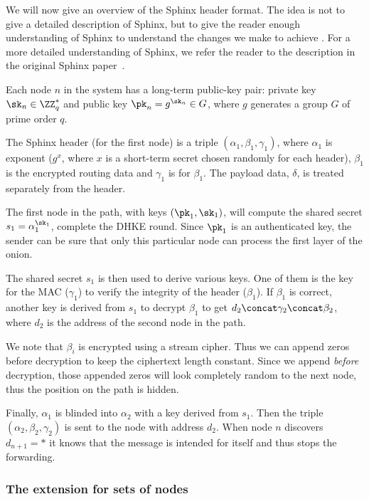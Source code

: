 We will now give an overview of the \ac{Sphinx} header format.
The idea is not to give a detailed description of \ac{Sphinx}, but to give the 
reader enough understanding of \ac{Sphinx} to understand the changes we make to 
achieve \Sphinxes.
For a more detailed understanding of Sphinx, we refer the reader to the 
description in the original Sphinx paper~\cite{Sphinx}.

Each node \(n\) in the system has a long-term public-key pair: private key 
\(\sk_n\in \ZZ_q^*\) and public key \(\pk_n = g^{\sk_n}\in G\), where \(g\) 
generates a group \(G\) of prime order \(q\).

The \ac{Sphinx} header (for the first node) is a triple \((\alpha_1, \beta_1, 
  \gamma_1)\), where \(\alpha_1\) is  exponent (\(g^x\), where \(x\) 
is a short-term secret chosen randomly for each header), \(\beta_1\) is the 
encrypted routing data and \(\gamma_1\) is  for \(\beta_1\).
The payload data, \(\delta\), is treated separately from the header.

The first node in the path, with keys \((\pk_1, \sk_1)\), will compute the 
shared secret \(s_1 = \alpha_1^{\sk_1}\), \ie complete the \ac{DHKE} round.
Since \(\pk_1\) is an authenticated key, the sender can be sure that only this 
particular node can process the first layer of the onion.

The shared secret \(s_1\) is then used to derive various keys.
One of them is the key for the \ac{MAC} (\(\gamma_1\)) to verify the integrity 
of the header (\(\beta_1\)).
If \(\beta_1\) is correct, another key is derived from \(s_1\) to decrypt 
\(\beta_1\) to get \(d_2\concat \gamma_2\concat \beta_2\), where \(d_2\) is the 
address of the second node in the path.

We note that \(\beta_i\) is encrypted using a stream cipher.
Thus we can append zeros before decryption to keep the ciphertext length 
constant.
Since we append \emph{before} decryption, those appended zeros will look 
completely random to the next node, thus the position on the path is hidden.

Finally, \(\alpha_1\) is blinded into \(\alpha_2\) with a key derived from 
\(s_1\).
Then the triple \((\alpha_2, \beta_2, \gamma_2)\) is sent to the node with 
address \(d_2\). When node \(n\) discovers \(d_{n+1} = *\) it knows that the message is intended 
for itself and thus stops the forwarding.

\subsubsection{The \Sphinxes extension for sets of nodes}


